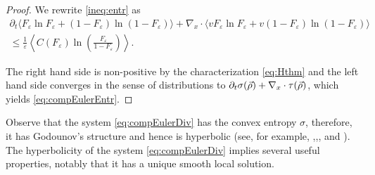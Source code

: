 \begin{proof}
We rewrite \eqref{ineq:entr}  as 
 \begin{multline}\label{ineq:entr2} \partial_t\langle   F_\varepsilon\ln F_\varepsilon + 
(1-F_\varepsilon)\ln (1-F_\varepsilon) \rangle+
\nabla_x\cdot\langle v F_\varepsilon\ln F_\varepsilon +
 v(1-F_\varepsilon)\ln (1-F_\varepsilon) \rangle\\\le \frac 1\varepsilon\left\langle
C(F_\varepsilon)\ln\left(\frac{F_\varepsilon}
{1-F_\varepsilon}\right)\right\rangle.\end{multline} 

The right hand side is non-positive by the characterization \eqref{eq:Hthm} and the left hand side converges in the sense of distributions to $\partial_t \sigma(\vec \rho)+\nabla_x\cdot\tau({\vec\rho})$, which yields \eqref{eq:compEulerEntr}.
\end{proof}

Observe that the system \eqref{eq:compEulerDiv} has the convex entropy $\sigma$, therefore, it has Godounov's structure and hence is hyperbolic (see, for example, \cite{Godunov1987Lois},\cite{Godunov1961Interesting},\cite{Godunov1978Elementy}, and \cite{Harten1998Convex}). The hyperbolicity of the system \eqref{eq:compEulerDiv} implies several useful properties, notably that it has a unique smooth local solution.
 
